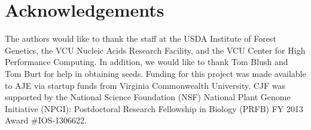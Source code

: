 \documentclass[11pt]{article}
\begin{document}
\section{Acknowledgements}

The authors would like to thank the staff at the USDA Institute of Forest Genetics, the 
VCU Nucleic Acids Research Facility, and the VCU Center for High Performance Computing. 
In addition, we would like to thank Tom Blush and Tom Burt for help in obtaining 
seeds. Funding for this project was made available to AJE via startup funds from Virginia 
Commonwealth University. CJF was supported by the National Science Foundation (NSF) National Plant Genome 
Initiative (NPGI): Postdoctoral Research Fellowship in Biology (PRFB) FY 2013 Award \#IOS-1306622.
\end{document}
